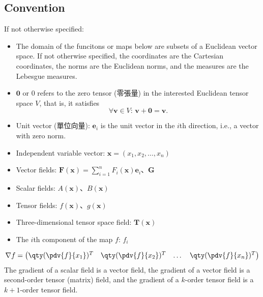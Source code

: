 \documentclass[a4paper,12pt]{report}
\begin{document}
\begin{itemize}
\begin{itemize}
\subsection{Convention}
If not otherwise specified:
\begin{itemize}
\item The domain of the funcitons or maps below are subsets of a Euclidean vector space. If not otherwise specified, the coordinates are the Cartesian coordinates, the norms are the Euclidean norms, and the measures are the Lebesgue measures.
\item $\mathbf{0}$ or $0$ refers to the zero tensor (零張量) in the interested Euclidean tensor space $V$, that is, it satisfies 
\[\forall\mathbf{v}\in V:\,\mathbf{v}+\mathbf{0}=\mathbf{v}.\]
\item Unit vector (單位向量): $\mathbf{e}_i$ is the unit vector in the $i$th direction, i.e., a vector with zero norm.
\item Independent variable vector: $\mathbf{x}=(x_1,x_2,\dots,x_n)$
\item Vector fields: $\mathbf{F}(\mathbf{x}) = \sum_{i=1}^n F_i(\mathbf{x}) \mathbf{e}_i$、$\mathbf{G}$
\item Scalar fields: $A(\mathbf{x})$、$B(\mathbf{x})$
\item Tensor fields: $f(\mathbf{x})$、$g(\mathbf{x})$
\item Three-dimensional tensor space field: $\mathbf{T}(\mathbf{x})$
\item The $i$th component of the map $f$: $f_i$
\end{itemize}
\[
\nabla f = \begin{pmatrix}\qty(\pdv{f}{x_1})^T & \qty(\pdv{f}{x_2})^T & \dots  & \qty(\pdv{f}{x_n})^T\end{pmatrix}
\]
The gradient of a scalar field is a vector field, the gradient of a vector field is a second-order tensor (matrix) field, and the gradient of a $k$-order tensor field is a $k+1$-order tensor field. 


\end{itemize}
\end{itemize}
\end{document}
